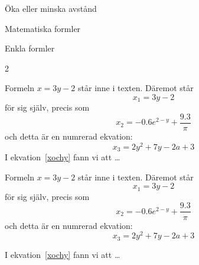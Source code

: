 \begin{Slide}{Öka eller minska avstånd}

  \begin{itemize}
  \end{itemize}
\end{Slide}


\begin{Slide}{Matematiska formler}

  \blankline
  \begin{itemize}
  \end{itemize}

\end{Slide}


\begin{Slide}{Enkla formler}
\begin{multicols}{2}
\SlideFontTiny  
  \begin{exlatex}
Formeln \(x=3y-2\) står inne i texten. Däremot står
\begin{displaymath}
  x_1 = 3y - 2
\end{displaymath}
för sig själv, precis som \[x_2 = -0.6e^{2-y} + \frac{9.3}{\pi}\] och detta är en numrerad ekvation:
\begin{equation}
  x_3 = 2y^2 + 7y - 2a + 3
  \label{xochy}
\end{equation}
I ekvation~\ref{xochy} fann vi att \ldots
\end{exlatex}

\vspace{1em}

Formeln \(x=3y-2\) står inne i texten. Däremot står
\begin{displaymath}
  x_1 = 3y - 2
\end{displaymath}
för sig själv, precis som
\[x_2 = -0.6e^{2-y} + \frac{9.3}{\pi}\]
och detta är en numrerad ekvation:
\begin{equation}
  x_3 = 2y^2 + 7y - 2a + 3
  \label{xochy}
\end{equation}

I ekvation~\ref{xochy} fann vi att \ldots
\end{multicols}
\end{Slide}

